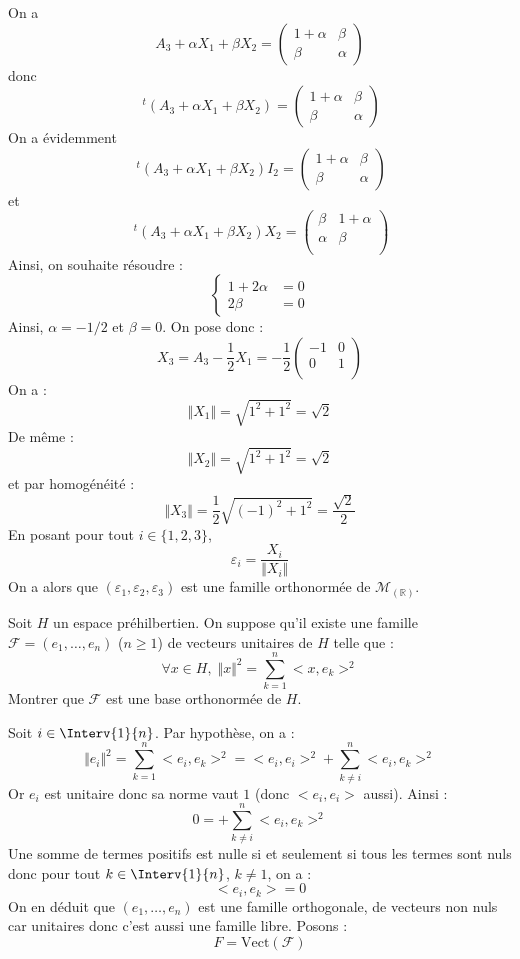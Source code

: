 \documentclass[a4paper,10pt]{report}
\begin{document}
On a 
$$ A_3+ \alpha X_1+ \beta X_2 = \begin{pmatrix}
1 + \alpha & \beta \\
\beta & \alpha
\end{pmatrix}$$
donc
$$ ~^t(A_3+ \alpha X_1+ \beta X_2)= \begin{pmatrix}
1 + \alpha & \beta \\
\beta & \alpha
\end{pmatrix}$$
On a évidemment
$$ ~^t(A_3+ \alpha X_1+ \beta X_2) I_2= \begin{pmatrix}
1 + \alpha & \beta \\
\beta & \alpha
\end{pmatrix}$$
et 
$$ ~^t(A_3+ \alpha X_1+ \beta X_2) X_2 = \begin{pmatrix}
\beta & 1 + \alpha \\
\alpha& \beta \\
\end{pmatrix}$$
Ainsi, on souhaite résoudre :
$$ \left\lbrace \begin{array}{rl}
1+ 2 \alpha & = 0 \\
2 \beta & = 0 
\end{array}\right.$$
Ainsi, $\alpha=-1/2$ et $\beta=0$.
On pose donc :
$$ X_3 = A_3 - \dfrac{1}{2} X_1 = -\dfrac{1}{2} \begin{pmatrix}
-1 & 0 \\
0 & 1 \\
\end{pmatrix}$$
On a :
$$ \Vert X_1 \Vert = \sqrt{1^2+1^2} = \sqrt{2}$$
De même :
$$ \Vert X_2 \Vert = \sqrt{1^2+1^2} = \sqrt{2}$$
et par homogénéité :
$$ \Vert X_3 \Vert = \dfrac{1}{2} \sqrt{(-1)^2+1^2} = \dfrac{\sqrt{2}}{2}$$
En posant pour tout $i \in \lbrace 1,2,3 \rbrace$,
$$ \varepsilon_i = \dfrac{X_i}{\Vert X_i \Vert}$$
On a alors que $(\varepsilon_1, \varepsilon_2, \varepsilon_3)$ est une famille orthonormée de $\mathcal{M}_(\mathbb{R})$.

\begin{Exa} Soit $H$ un espace préhilbertien. On suppose qu'il existe une famille $\mathcal{F}=(e_1, \ldots, e_n)$ ($n \geq 1$) de vecteurs unitaires de $H$ telle que :
$$ \forall x \in H, \; \Vert x \Vert^2= \sum_{k=1}^n <x,e_k>^2 $$
Montrer que $\mathcal{F}$ est une base orthonormée de $H$.
\end{Exa}

\corr Soit $i \in \Interv{1}{n}$. Par hypothèse, on a :
$$ \Vert e_i \Vert^2= \sum_{k=1}^n <e_i,e_k>^2 = <e_i,e_i>^2 + \sum_{k \neq i}^n <e_i,e_k>^2 $$
Or $e_i$ est unitaire donc sa norme vaut $1$ (donc $<e_i,e_i>$ aussi). Ainsi :
$$ 0 = + \sum_{k \neq i}^n <e_i,e_k>^2 $$
Une somme de termes positifs est nulle si et seulement si tous les termes sont nuls donc pour tout $k \in \Interv{1}{n}$, $k \neq 1$, on a :
$$<e_i,e_k>=0$$
On en déduit que $(e_1, \ldots, e_n)$ est une famille orthogonale, de vecteurs non nuls car unitaires donc c'est aussi une famille libre. Posons :
$$ F = \textrm{Vect}(\mathcal{F})$$
\end{document}
